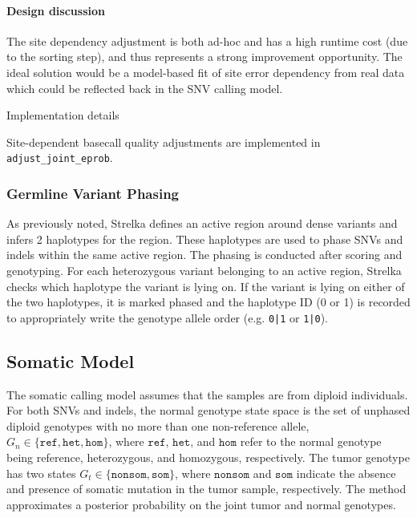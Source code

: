 \documentclass{article}
\newenvironment{raggedParagraph}[1]
{
    \begin{paragraph} {#1}
        \raggedright
    }
    {
    \end{paragraph}
}
\begin{document}
\paragraph{Design discussion}

The site dependency adjustment is both ad-hoc and has a high runtime cost (due to the sorting step), and thus represents a strong improvement opportunity. The ideal solution would be a model-based fit of site error dependency from real data which could be reflected back in the SNV calling model.

\begin{raggedParagraph}{Implementation details}

Site-dependent basecall quality adjustments are implemented in \verb|adjust_joint_eprob|.

\end{raggedParagraph}

\fi %


\subsubsection{Germline Variant Phasing}
\label{sec:ReadBackedPhasing}
As previously noted, Strelka defines an active region around dense variants and infers 2 haplotypes for the region. These haplotypes are used to phase SNVs and indels within the same active region. The phasing is conducted after scoring and genotyping. For each heterozygous variant belonging to an active region, Strelka checks which haplotype the variant is lying on. If the variant is lying on either of the two haplotypes, it is marked phased and the haplotype ID (0 or 1) is recorded to appropriately write the genotype allele order (e.g. \verb/0|1/ or \verb/1|0/).


\subsection{Somatic Model}
\label{sec:somatic}

The somatic calling model assumes that the samples are from diploid individuals. For both SNVs and indels, the normal genotype state space is the set of unphased diploid genotypes with no more than one non-reference allele, $G_n \in \{ \texttt{ref}, \texttt{het}, \texttt{hom}\}$, where $\texttt{ref}$, $\texttt{het}$, and $\texttt{hom}$ refer to the normal genotype being reference, heterozygous, and homozygous, respectively. The tumor genotype has two states $G_t \in \{ \texttt{nonsom}, \texttt{som} \}$, where $\texttt{nonsom}$ and $\texttt{som}$ indicate the absence and presence of somatic mutation in the tumor sample, respectively. The method approximates a posterior probability on the joint tumor and normal genotypes.
\end{document}
